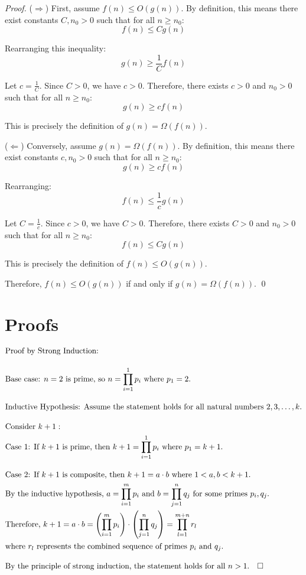 \documentclass{article}
\theoremstyle{definition}
\begin{document}
\begin{proof}
($\Rightarrow$) First, assume $f(n) \leq O(g(n))$. By definition, this means there exist constants $C, n_0 > 0$ such that for all $n \geq n_0$:
\[ f(n) \leq Cg(n) \]

Rearranging this inequality:
\[ g(n) \geq \frac{1}{C}f(n) \]

Let $c = \frac{1}{C}$. Since $C > 0$, we have $c > 0$. Therefore, there exists $c > 0$ and $n_0 > 0$ such that for all $n \geq n_0$:
\[ g(n) \geq cf(n) \]

This is precisely the definition of $g(n) = \Omega(f(n))$.

($\Leftarrow$) Conversely, assume $g(n) = \Omega(f(n))$. By definition, this means there exist constants $c, n_0 > 0$ such that for all $n \geq n_0$:
\[ g(n) \geq cf(n) \]

Rearranging:
\[ f(n) \leq \frac{1}{c}g(n) \]

Let $C = \frac{1}{c}$. Since $c > 0$, we have $C > 0$. Therefore, there exists $C > 0$ and $n_0 > 0$ such that for all $n \geq n_0$:
\[ f(n) \leq Cg(n) \]

This is precisely the definition of $f(n) \leq O(g(n))$.

Therefore, $f(n) \leq O(g(n))$ if and only if $g(n) = \Omega(f(n))$. \qed
\end{proof}

\section{Proofs}


    \begin{align}
        &\text{Proof by Strong Induction:} \notag \\[1em]
        &\text{Base case: } n = 2 \text{ is prime, so } n = \prod_{i=1}^1 p_i \text{ where } p_1 = 2. \notag \\[1em]
        &\text{Inductive Hypothesis: Assume the statement holds for all natural numbers } 2,3,\ldots,k. \notag \\[1em]
        &\text{Consider } k+1: \notag \\
        &\text{Case 1: If } k+1 \text{ is prime, then } k+1 = \prod_{i=1}^1 p_i \text{ where } p_1 = k+1. \notag \\[1em]
        &\text{Case 2: If } k+1 \text{ is composite, then } k+1 = a \cdot b \text{ where } 1 < a,b < k+1. \notag \\
        &\text{By the inductive hypothesis, } a = \prod_{i=1}^m p_i \text{ and } b = \prod_{j=1}^n q_j \text{ for some primes } p_i, q_j. \notag \\
        &\text{Therefore, } k+1 = a \cdot b = \left(\prod_{i=1}^m p_i\right) \cdot \left(\prod_{j=1}^n q_j\right) = \prod_{l=1}^{m+n} r_l \notag \\
        &\text{where } r_l \text{ represents the combined sequence of primes } p_i \text{ and } q_j. \notag \\[1em]
        &\text{By the principle of strong induction, the statement holds for all } n > 1. \quad \square \notag
    \end{align}
\end{document}
